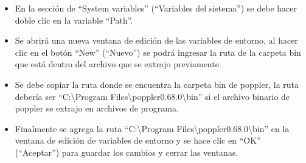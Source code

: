 \documentclass[letterpaper,10pt,openany,spanish]{sphinxmanual}
\begin{document}
\begin{enumerate}
\begin{itemize}
\end{itemize}

\begin{itemize}
\item {} 
En la sección de “System variables” (“Variables del sistema”) se debe hacer doble clic en la variable “Path”.

\end{itemize}

\begin{itemize}
\item {} 
Se abrirá una nueva ventana de edición de las variables de entorno, al hacer clic en el botón “New” (“Nuevo”) se podrá ingresar la ruta de la carpeta bin que está dentro del archivo que se extrajo previamente.

\end{itemize}

\begin{itemize}
\item {} 
Se debe copiar la ruta donde se encuentra la carpeta bin de poppler, la ruta debería ser “C:\textbackslash{}Program Files\textbackslash{}poppler\sphinxhyphen{}0.68.0\textbackslash{}bin” si el archivo binario de poppler se extrajo en archivos de programa.

\end{itemize}

\begin{itemize}
\item {} 
Finalmente se agrega la ruta “C:\textbackslash{}Program Files\textbackslash{}poppler\sphinxhyphen{}0.68.0\textbackslash{}bin” en la ventana de edición de variables de entorno y se hace clic en “OK” (“Aceptar”) para guardar los cambios y cerrar las ventanas.

\end{itemize}


\end{enumerate}
\end{document}
